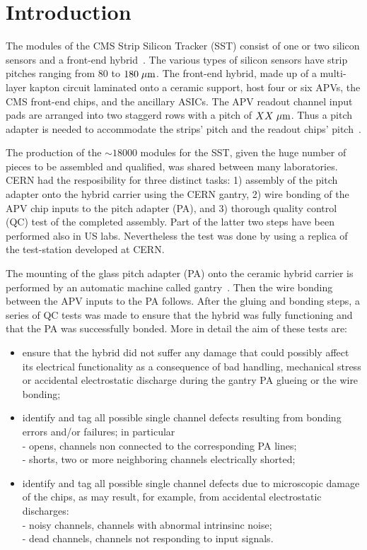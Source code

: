 \section{Introduction}

The modules of the CMS Strip Silicon Tracker (SST) consist of one or
two silicon sensors and a front-end
hybrid~\cite{bigcmspaper,tdr,modules,sensors,hybrid}. The various types of  
silicon sensors have strip pitches ranging from $80$ to $180\; \mu \rm m$. The
front-end hybrid, made up of a multi-layer kapton circuit laminated
onto a ceramic support, host four 
or six APVs, the CMS front-end chips, and the ancillary ASICs. The APV
readout channel input pads are arranged into two staggerd rows with a
pitch of $XX\; \mu \rm m$. Thus a pitch adapter is needed to accommodate the 
strips' pitch and the readout chips' pitch~\cite{pa}.
 
The production of the $\sim18000$ modules for the SST, given the huge number of
pieces to be assembled and qualified, was shared between many 
laboratories. CERN had the resposibility for three distinct tasks: 1)
assembly of the pitch adapter onto the hybrid carrier using the CERN
gantry, 2) wire bonding of the APV chip inputs to the pitch adapter (PA),
and 3) thorough quality control (QC) test of the completed
assembly. Part of the latter two steps have been performed also in US
labs. Nevertheless the test was done by using a replica of the
test-station developed at CERN. 

The mounting of the glass pitch adapter (PA) onto the ceramic hybrid
carrier is performed by an automatic machine called
gantry~\cite{gantry}. Then the wire bonding between the APV inputs to
the PA follows. After the gluing and bonding steps, a series of QC
tests was made to ensure that the hybrid was fully functioning and
that the PA was successfully bonded. More in detail the aim of these 
tests are:
\begin{itemize}
\item ensure that the hybrid did not suffer any damage that could
  possibly affect its electrical functionality as a consequence of bad
  handling, mechanical stress or accidental electrostatic discharge
  during the gantry PA glueing or the wire bonding;
\item identify and tag all possible single channel defects resulting
  from bonding errors and/or failures; in particular\\
- opens, channels non connected
  to the corresponding PA lines;\\
- shorts, two or more neighboring
  channels electrically shorted;
\item identify and tag all possible single channel defects due to
  microscopic damage of the chips, as may result, for example, from
  accidental electrostatic discharges:\\
- noisy channels, channels with abnormal intrinsinc noise;\\
- dead channels, channels not responding to input signals.
\end{itemize}

